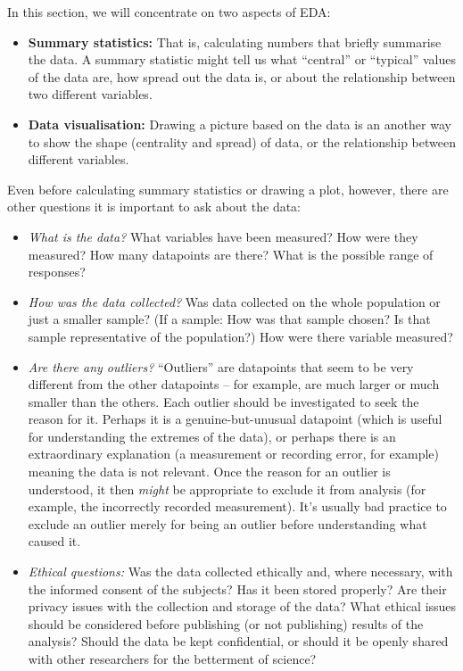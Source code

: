 \documentclass[
  a4paper,
]{book}
\providecommand{\tightlist}{%
  \setlength{\itemsep}{0pt}\setlength{\parskip}{0pt}}
\theoremstyle{definition}
\theoremstyle{definition}
\theoremstyle{definition}
\theoremstyle{definition}
\theoremstyle{remark}
\begin{document}
In this section, we will concentrate on two aspects of EDA:

\begin{itemize}
\tightlist
\item
  \textbf{Summary statistics:} That is, calculating numbers that briefly summarise the data. A summary statistic might tell us what ``central'' or ``typical'' values of the data are, how spread out the data is, or about the relationship between two different variables.
\item
  \textbf{Data visualisation:} Drawing a picture based on the data is an another way to show the shape (centrality and spread) of data, or the relationship between different variables.
\end{itemize}

Even before calculating summary statistics or drawing a plot, however, there are other questions it is important to ask about the data:

\begin{itemize}
\tightlist
\item
  \emph{What is the data?} What variables have been measured? How were they measured? How many datapoints are there? What is the possible range of responses?
\item
  \emph{How was the data collected?} Was data collected on the whole population or just a smaller sample? (If a sample: How was that sample chosen? Is that sample representative of the population?) How were there variable measured?
\item
  \emph{Are there any outliers?} ``Outliers'' are datapoints that seem to be very different from the other datapoints -- for example, are much larger or much smaller than the others. Each outlier should be investigated to seek the reason for it. Perhaps it is a genuine-but-unusual datapoint (which is useful for understanding the extremes of the data), or perhaps there is an extraordinary explanation (a measurement or recording error, for example) meaning the data is not relevant. Once the reason for an outlier is understood, it then \emph{might} be appropriate to exclude it from analysis (for example, the incorrectly recorded measurement). It's usually bad practice to exclude an outlier merely for being an outlier before understanding what caused it.
\item
  \emph{Ethical questions:} Was the data collected ethically and, where necessary, with the informed consent of the subjects? Has it been stored properly? Are their privacy issues with the collection and storage of the data? What ethical issues should be considered before publishing (or not publishing) results of the analysis? Should the data be kept confidential, or should it be openly shared with other researchers for the betterment of science?
\end{itemize}
\end{document}
